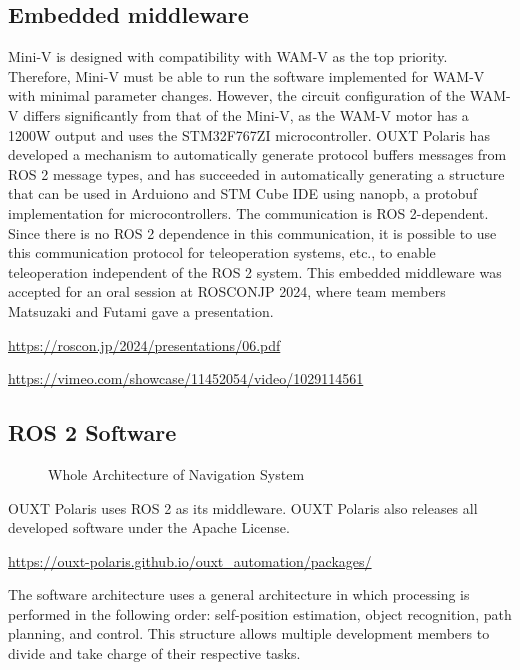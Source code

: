 \documentclass[lettersize,journal]{IEEEtran}
\begin{document}
\subsection{Embedded middleware}

Mini-V is designed with compatibility with WAM-V as the top priority.
Therefore, Mini-V must be able to run the software implemented for WAM-V with minimal parameter changes.
However, the circuit configuration of the WAM-V differs significantly from that of the Mini-V, as the WAM-V motor has a 1200W output and uses the STM32F767ZI microcontroller.
OUXT Polaris has developed a mechanism to automatically generate protocol buffers messages from ROS 2 message types, and has succeeded in automatically generating a structure that can be used in Arduiono and STM Cube IDE using nanopb, a protobuf implementation for microcontrollers. The communication is ROS 2-dependent.
Since there is no ROS 2 dependence in this communication, it is possible to use this communication protocol for teleoperation systems, etc., to enable teleoperation independent of the ROS 2 system.
This embedded middleware was accepted for an oral session at ROSCONJP 2024, where team members Matsuzaki and Futami gave a presentation.

\url{https://roscon.jp/2024/presentations/06.pdf}

\url{https://vimeo.com/showcase/11452054/video/1029114561}

\subsection{ROS 2 Software}

\begin{figure}[H]
  \begin{center}
  \end{center}
  \caption{Whole Architecture of Navigation System}
  \label{fig:arch_nav}
\end{figure}

OUXT Polaris uses ROS 2 as its middleware.
OUXT Polaris also releases all developed software under the Apache License.

\url{https://ouxt-polaris.github.io/ouxt_automation/packages/}

The software architecture uses a general architecture in which processing is performed in the following order: self-position estimation, object recognition, path planning, and control.
This structure allows multiple development members to divide and take charge of their respective tasks.
\end{document}
